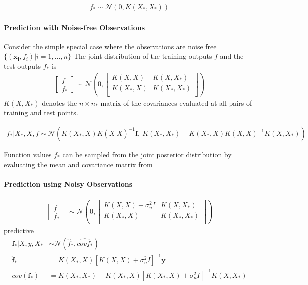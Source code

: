 \documentclass[a4paper]{article}
\begin{document}
\begin{align}
  f_* \sim \mathcal{N} (0, K(X_*, X_*))
\end{align}

\paragraph{Prediction with Noise-free Observations}
Consider the simple special case where the observations are noise free $\{(\mathbf{x_i},f_i)| i=1,...,n\}$
The joint distribution of the training outputs $f$ and the test outputs $f_*$ is
\begin{align}
  \begin{bmatrix}
    f\\
    f_*
  \end{bmatrix}
  \sim \mathcal{N}(0,
  \begin{bmatrix}
    K(X,X) & K(X,X_*)\\
    K(X_*,X) & K(X_*,X_*)\\
  \end{bmatrix})
\end{align}
$K(X, X_*)$ denotes the $n \times n_*$ matrix of the covariances evaluated at all pairs of training and test points.

\begin{align}
\label{eq:joint_posterior}
  f_*|X_*,X,f \sim \mathcal{N} (K(X_*,X) K(X_,X)^{-1} \mathbf{f},\: K(X_*,X_*) - K(X_*,X) K(X,X)^{-1} K(X,X_*) )
\end{align}

Function values $f_*$ can be sampled from the joint posterior distribution by evaluating the mean and covariance matrix from \cite{eq:joint_posterior} 

\paragraph{Prediction using Noisy Observations}

\begin{align}
  \begin{bmatrix}
    f\\
    f_*
  \end{bmatrix}
  \sim \mathcal{N}(0,
  \begin{bmatrix}
    K(X,X) + \sigma_n^2 I & K(X,X_*)\\
    K(X_*,X) & K(X_*,X_*)\\
  \end{bmatrix})
\end{align}
predictive
\begin{align*}
  \mathbf{f}_*|X,y,X_* &\sim \mathcal{N}(\hat{f}_*,\hat{cov{f_*}})\\
  \hat{\mathbf{f}}_* &= K(X_*,X)[K(X,X)+\sigma_n^2I]^{-1} \mathbf{y}\\
  cov(\mathbf{f}_*) &= K(X_*,X_*) - K(X_*,X)[K(X_*,X)+\sigma_n^2I]^{-1} K(X,X_*)
\end{align*}
\end{document}
